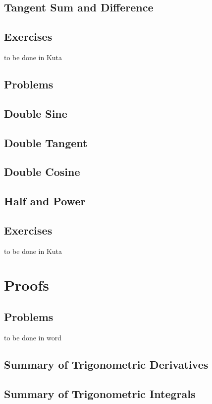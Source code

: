 \subsection{Tangent Sum and Difference}
\newpage
\subsection{Exercises}
to be done in Kuta


{}
\subsection{Problems}
\noindent{}
\subsection{Double Sine}
\subsection{Double Tangent}
\subsection{Double Cosine}
\subsection{Half and Power}
\newpage
\subsection{Exercises}
to be done in Kuta


\newpage
\section{Proofs}
\subsection{Problems}
to be done in word
\newpage
\subsection{Summary of Trigonometric Derivatives}
\subsection{Summary of Trigonometric Integrals}
